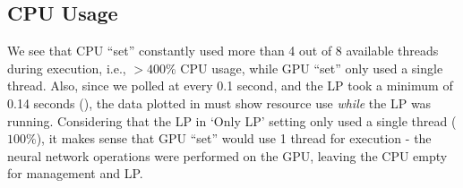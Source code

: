 \subsection{CPU Usage}
We see that CPU ``set'' constantly used more than 4 out of 8 available threads during execution, i.e., $>400\%$ CPU usage, while GPU ``set'' only used a single thread. Also, since we polled at every 0.1 second, and the LP took a minimum of 0.14 seconds (), the data plotted in  must show resource use \textit{while} the LP was running. Considering that the LP in `Only LP' setting only used a single thread ($100\%$), it makes sense that GPU ``set'' would use 1 thread for execution - the neural network operations were performed on the GPU, leaving the CPU empty for management and LP. 
